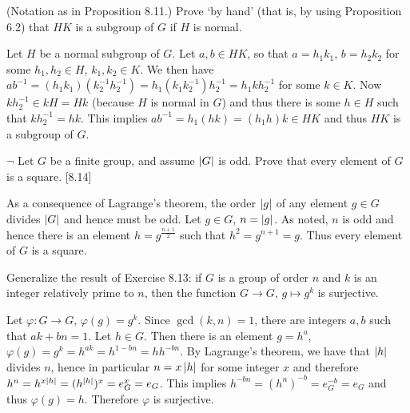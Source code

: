 \begin{problem}
	(Notation as in Proposition 8.11.) Prove `by hand' (that is, by using Proposition 6.2) that $HK$ is a subgroup of $G$ if $H$ is normal.
\end{problem}

\begin{solution}
	Let $H$ be a normal subgroup of $G$. Let $a, b \in HK$, so that $a = h_1 k_1$, $b = h_2 k_2$ for some $h_1, h_2 \in H$, $k_1, k_2 \in K$. We then have $ab^{-1} = (h_1 k_1) (k_2^{-1} h_2^{-1}) = h_1 (k_1 k_2^{-1}) h_2^{-1} = h_1 k h_2^{-1}$ for some $k \in K$. Now $k h_2^{-1} \in kH = Hk$ (because $H$ is normal in $G$) and thus there is some $h \in H$ such that $k h_2^{-1} = h k$. This implies $ab^{-1} = h_1 (h k) = (h_1 h) k \in HK$ and thus $HK$ is a subgroup of $G$.
\end{solution}

\begin{problem}
	$\neg$ Let $G$ be a finite group, and assume $\left|G\right|$ is odd. Prove that every element of $G$ is a square. [8.14]
\end{problem}

\begin{solution}
	As a consequence of Lagrange's theorem, the order $\left|g\right|$ of any element $g \in G$ divides $\left|G\right|$ and hence must be odd. Let $g \in G$, $n = \left|g\right|$. As noted, $n$ is odd and hence there is an element $h = g^{\frac{n+1}{2}}$ such that $h^2 = g^{n+1} = g$. Thus every element of $G$ is a square.
\end{solution}

\begin{problem}
	Generalize the result of Exercise 8.13: if $G$ is a group of order $n$ and $k$ is an integer relatively prime to $n$, then the function $G \to G$, $g \mapsto g^k$ is surjective.
\end{problem}

\begin{solution}
	Let $\varphi: G \to G$, $\varphi(g) = g^k$. Since $\gcd(k, n) = 1$, there are integers $a, b$ such that $ak + bn = 1$. Let $h \in G$. Then there is an element $g = h^a$, $\varphi(g) = g^k = h^{ak} = h^{1 - bn} = h h^{-bn}$. By Lagrange's theorem, we have that $\left|h\right|$ divides $n$, hence in particular $n = x\left|h\right|$ for some integer $x$ and therefore $h^n = h^{x \left|h\right|} = (h^{\left|h\right|})^x = e_G^x = e_G$. This implies $h^{-bn} = (h^n)^{-b} = e_G^{-b} = e_G$ and thus $\varphi(g) = h$. Therefore $\varphi$ is surjective.
\end{solution}


